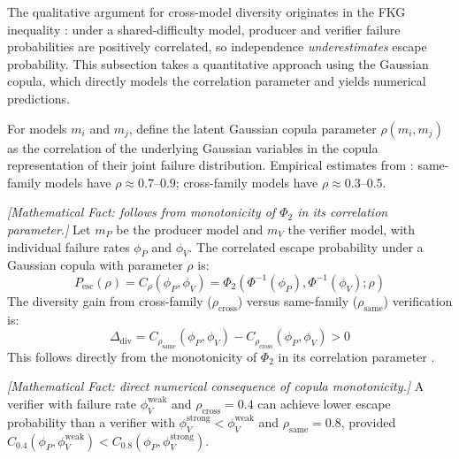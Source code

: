 The qualitative argument for cross-model diversity originates in the FKG inequality \citep{fkg1971}: under a shared-difficulty model, producer and verifier failure probabilities are positively correlated, so independence \emph{underestimates} escape probability. This subsection takes a quantitative approach using the Gaussian copula, which directly models the correlation parameter and yields numerical predictions.

\begin{definition}
\label{def:routing-blindspot}
For models $m_i$ and $m_j$, define the latent Gaussian copula parameter $\rho(m_i, m_j)$ as the correlation of the underlying Gaussian variables in the copula representation of their joint failure distribution. Empirical estimates from \citet{correlatedensemble2026}: same-family models have $\rho \approx 0.7$--$0.9$; cross-family models have $\rho \approx 0.3$--$0.5$.
\end{definition}

\begin{proposition}
\emph{[Mathematical Fact: follows from monotonicity of $\Phi_2$ in its correlation parameter.]}
\label{prop:routing-diversity}
Let $m_P$ be the producer model and $m_V$ the verifier model, with individual failure rates $\phi_P$ and $\phi_V$. The correlated escape probability under a Gaussian copula \citep{sklar1959} with parameter $\rho$ is:
\begin{equation}
P_{\mathrm{esc}}(\rho) = C_\rho(\phi_P, \phi_V) = \Phi_2(\Phi^{-1}(\phi_P), \Phi^{-1}(\phi_V); \rho)
\end{equation}
The diversity gain from cross-family ($\rho_{\mathrm{cross}}$) versus same-family ($\rho_{\mathrm{same}}$) verification is:
\begin{equation}
\Delta_{\mathrm{div}} = C_{\rho_{\mathrm{same}}}(\phi_P, \phi_V) - C_{\rho_{\mathrm{cross}}}(\phi_P, \phi_V) > 0
\end{equation}
This follows directly from the monotonicity of $\Phi_2$ in its correlation parameter \citep{nelsen2006copulas}.
\end{proposition}

\begin{corollary}
\emph{[Mathematical Fact: direct numerical consequence of copula monotonicity.]}
\label{cor:routing-weakbeats}
A verifier with failure rate $\phi_V^{\mathrm{weak}}$ and $\rho_{\mathrm{cross}} = 0.4$ can achieve lower escape probability than a verifier with $\phi_V^{\mathrm{strong}} < \phi_V^{\mathrm{weak}}$ and $\rho_{\mathrm{same}} = 0.8$, provided $C_{0.4}(\phi_P, \phi_V^{\mathrm{weak}}) < C_{0.8}(\phi_P, \phi_V^{\mathrm{strong}})$.
\end{corollary}

